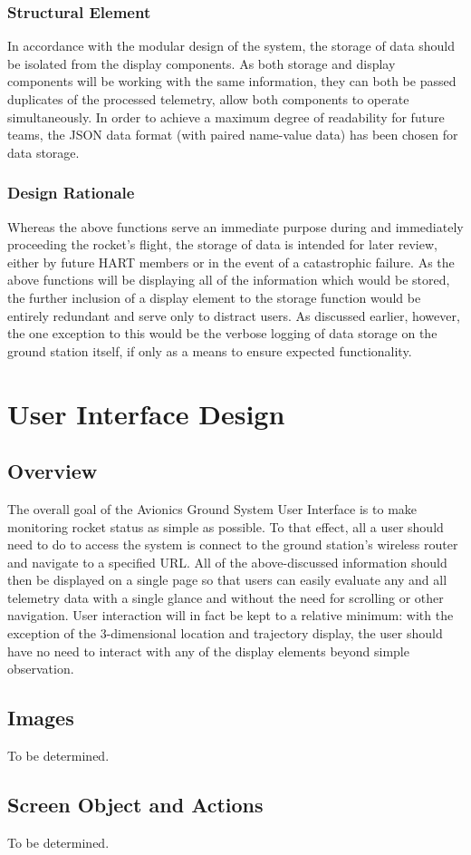 \documentclass[journal,10pt,onecolumn,compsoc]{IEEEtran}
\begin{document}
		\subsubsection{Structural Element}
			In accordance with the modular design of the system, the storage of data should be isolated from the display components.
			As both storage and display components will be working with the same information, they can both be passed duplicates of the processed telemetry, allow both components to operate simultaneously.
			In order to achieve a maximum degree of readability for future teams, the JSON data format (with paired name-value data) has been chosen for data storage.

		\subsubsection{Design Rationale}
			Whereas the above functions serve an immediate purpose during and immediately proceeding the rocket's flight, the storage of data is intended for later review, either by future HART members or in the event of a catastrophic failure.
			As the above functions will be displaying all of the information which would be stored, the further inclusion of a display element to the storage function would be entirely redundant and serve only to distract users.
			As discussed earlier, however, the one exception to this would be the verbose logging of data storage on the ground station itself, if only as a means to ensure expected functionality.

	
	
\newpage


\section{User Interface Design}

	\subsection{Overview}
		The overall goal of the Avionics Ground System User Interface is to make monitoring rocket status as simple as possible.
		To that effect, all a user should need to do to access the system is connect to the ground station's wireless router and navigate to a specified URL.
		All of the above-discussed information should then be displayed on a single page so that users can easily evaluate any and all telemetry data with a single glance and without the need for scrolling or other navigation.
		User interaction will in fact be kept to a relative minimum: with the exception of the 3-dimensional location and trajectory display, the user should have no need to interact with any of the display elements beyond simple observation.
	
	\subsection{Images}
		To be determined.
		
	\subsection{Screen Object and Actions}
		To be determined.
		
\end{document}
